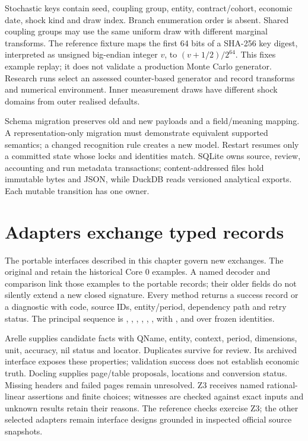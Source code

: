Stochastic keys contain seed, coupling group, entity, contract/cohort,
economic date, shock kind and draw index. Branch enumeration order is absent.
Shared coupling groups may use the same uniform draw with different marginal
transforms. The reference fixture maps the first 64 bits of a SHA-256 key
digest, interpreted as unsigned big-endian integer $v$, to
$(v+1/2)/2^{64}$. This fixes example replay; it does not validate a production
Monte Carlo generator. Research runs select an assessed counter-based
generator and record transforms and numerical environment. Inner measurement
draws have different shock domains from outer realised defaults.

Schema migration preserves old and new payloads and a field/meaning mapping.
A representation-only migration must demonstrate equivalent supported
semantics; a changed recognition rule creates a new model. Restart resumes
only a committed state whose locks and identities match. SQLite owns source,
review, accounting and run metadata transactions; content-addressed files hold immutable
bytes and JSON, while DuckDB reads versioned analytical exports. Each mutable
transition has one owner.

\section{Adapters exchange typed records}

The portable interfaces described in this chapter govern new exchanges.
The original  and
 retain the historical Core 0 examples.
A named decoder and comparison link those examples to the portable records;
their older fields do not silently extend a new closed signature. Every method returns a success record or a
diagnostic with code, source IDs, entity/period, dependency path and retry
status. The principal sequence is , ,
, , , , with
,  and  over frozen identities.

Arelle supplies candidate facts with QName, entity, context, period,
dimensions, unit, accuracy, nil status and locator. Duplicates survive for
review. Its archived  interface exposes these
properties; validation success does not establish economic truth. Docling
supplies page/table proposals, locations and conversion status. Missing
headers and failed pages remain unresolved. Z3 receives named rational-linear
assertions and finite choices; witnesses are checked against exact inputs and
unknown results retain their reasons. The reference checks exercise Z3;
the other selected adapters remain interface designs grounded in inspected
official source snapshots.

